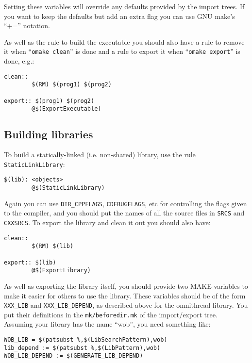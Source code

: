 \documentclass[11pt,twoside,onecolumn]{article}
\begin{document}
Setting these variables will override any defaults provided by the import
trees.  If you want to keep the defaults but add an extra flag you can use GNU
make's ``+='' notation.

As well as the rule to build the executable you should also have a rule to
remove it when ``{\tt omake clean}'' is done and a rule to export it when
``{\tt omake export}'' is done, e.g.:

{\footnotesize \begin{verbatim}
clean::
        $(RM) $(prog1) $(prog2)

export:: $(prog1) $(prog2)
        @$(ExportExecutable)
\end{verbatim}}

\subsection{Building libraries}
\label{buildlib}

To build a statically-linked (i.e. non-shared) library, use the rule
{\tt StaticLinkLibrary}:

{\footnotesize \begin{verbatim}
$(lib): <objects>
        @$(StaticLinkLibrary)
\end{verbatim}}

Again you can use \verb|DIR_CPPFLAGS|, {\tt CDEBUGFLAGS}, etc for controlling
the flags given to the compiler, and you should put the names of all the source
files in {\tt SRCS} and {\tt CXXSRCS}.  To export the library and clean it out
you should also have:

{\footnotesize \begin{verbatim}
clean::
        $(RM) $(lib)

export:: $(lib)
        @$(ExportLibrary)
\end{verbatim}}

As well as exporting the library itself, you should provide two MAKE variables
to make it easier for others to use the library.  These variables should be of
the form \verb|XXX_LIB| and \verb|XXX_LIB_DEPEND|, as described above for the
omnithread library.  You put their definitions in the \verb|mk/beforedir.mk| of
the import/export tree. Assuming your library has the name ``wob'', you need
something like:

{\footnotesize \begin{verbatim}
WOB_LIB = $(patsubst %,$(LibSearchPattern),wob)
lib_depend := $(patsubst %,$(LibPattern),wob)
WOB_LIB_DEPEND := $(GENERATE_LIB_DEPEND)
\end{verbatim}}
\end{document}
